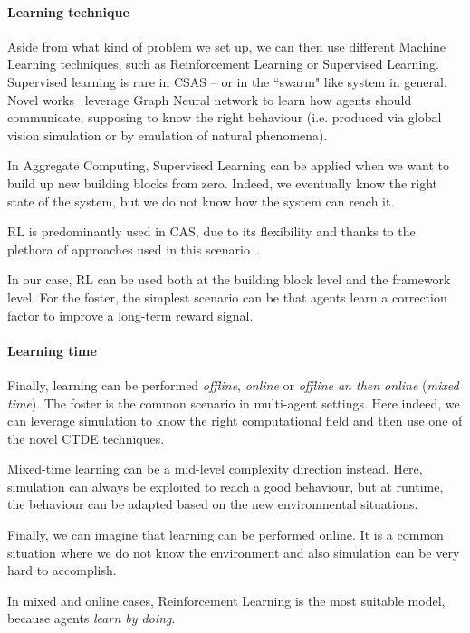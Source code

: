 \documentclass[conference]{IEEEtran}
\begin{document}
\paragraph{Learning technique}
Aside from what kind of problem we set up, we can then use different Machine Learning techniques,
 such as Reinforcement Learning or Supervised Learning.
%
Supervised learning is rare in CSAS -- or in the ``swarm" like system in general.
%
Novel works~\cite{DBLP:conf/corl/TolstayaGPP0R19} leverage Graph Neural network to learn how agents should communicate, 
 supposing to know the right behaviour (i.e. produced via global vision simulation or by emulation of natural phenomena).

In Aggregate Computing, Supervised Learning can be applied when we want to build up new building blocks from zero. 
% 
Indeed, we eventually know the right state of the system, but we do not know how the system can reach it.

RL is predominantly used in CAS, 
 due to its flexibility and thanks to the plethora of approaches used in this scenario~\cite{csas-and-marl}.

In our case, RL can be used both at the building block level and the framework level.
%
For the foster, the simplest scenario can be that agents learn a correction factor to improve a long-term reward signal.
 
\paragraph{Learning time}
Finally, learning can be performed \textit{offline}, \textit{online} or \textit{offline an then online} (\textit{mixed time}).
% 
The foster is the common scenario in multi-agent settings.
 Here indeed, we can leverage simulation to know the right computational field and then use one of the novel CTDE techniques. 

Mixed-time learning can be a mid-level complexity direction instead.
 Here, simulation can always be exploited to reach a good behaviour, but at runtime, 
 the behaviour can be adapted based on the new environmental situations. 

Finally, we can imagine that learning can be performed online. 
 It is a common situation where we do not know the environment and also simulation can be very hard to accomplish. 
 
In mixed and online cases, Reinforcement Learning is the most suitable model, because agents \textit{learn by doing}.
\end{document}
